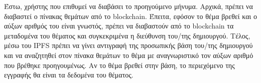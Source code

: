 Έστω, χρήστης που επιθυμεί να διαβάσει το προηγούμενο μήνυμα. Αρχικά, πρέπει να διαβαστεί ο πίνακας θεμάτων από το blockchain. Έπειτα, εφόσον το θέμα βρεθεί και ο αύξων αριθμός του είναι γνωστός, πρέπει να διαβαστούν από το blockchain τα μεταδομένα του θέματος και συγκεκριμένα η διεύθυνση του/της δημιουργού. Τέλος, μέσω του IPFS πρέπει να γίνει αντιγραφή της προσωπικής βάση του/της δημιουργού και να αναζητηθεί στον πίνακα θεμάτων το θέμα με αναγνωριστικό τον αύξων αριθμό που βρέθηκε προηγουμένως. Αν το θέμα βρεθεί στην βάση, το περιεχόμενο της εγγραφής θα είναι τα δεδομένα του θέματος.
